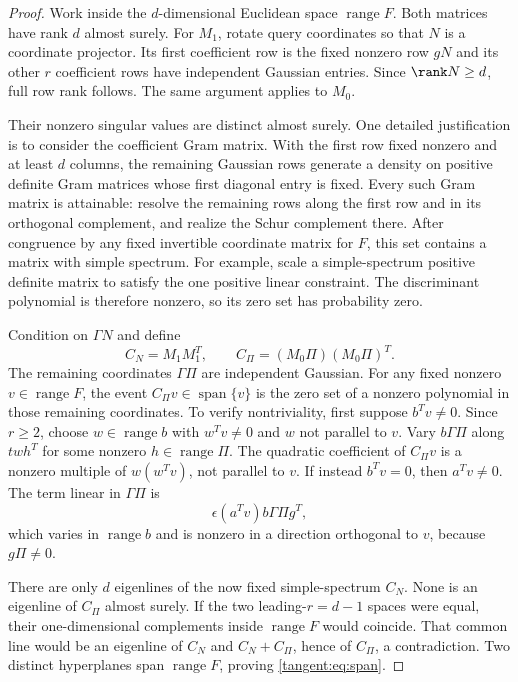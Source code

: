 \documentclass[11pt,oneside,openany,a4paper]{book}
\numberwithin{equation}{chapter}
\theoremstyle{definition}
\theoremstyle{remark}
\DeclareMathOperator{\ran}{range}\DeclareMathOperator{\OPT}{OPT}
\begin{document}
\begin{proof}
Work inside the $d$-dimensional Euclidean space $\ran F$. Both matrices have rank $d$ almost surely. For $M_1$, rotate query coordinates so that $N$ is a coordinate projector. Its first coefficient row is the fixed nonzero row $gN$ and its other $r$ coefficient rows have independent Gaussian entries. Since $\rank N\ge d$, full row rank follows. The same argument applies to $M_0$.

Their nonzero singular values are distinct almost surely. One detailed justification is to consider the coefficient Gram matrix. With the first row fixed nonzero and at least $d$ columns, the remaining Gaussian rows generate a density on positive definite Gram matrices whose first diagonal entry is fixed. Every such Gram matrix is attainable: resolve the remaining rows along the first row and in its orthogonal complement, and realize the Schur complement there. After congruence by any fixed invertible coordinate matrix for $F$, this set contains a matrix with simple spectrum. For example, scale a simple-spectrum positive definite matrix to satisfy the one positive linear constraint. The discriminant polynomial is therefore nonzero, so its zero set has probability zero.

Condition on $\Gamma N$ and define
\[
 C_N=M_1M_1^T,\qquad C_\Pi=(M_0\Pi)(M_0\Pi)^T.
\]
The remaining coordinates $\Gamma\Pi$ are independent Gaussian. For any fixed nonzero $v\in\ran F$, the event $C_\Pi v\in\operatorname{span}\{v\}$ is the zero set of a nonzero polynomial in those remaining coordinates. To verify nontriviality, first suppose $b^Tv\ne0$. Since $r\ge2$, choose $w\in\ran b$ with $w^Tv\ne0$ and $w$ not parallel to $v$. Vary $b\Gamma\Pi$ along $twh^T$ for some nonzero $h\in\ran\Pi$. The quadratic coefficient of $C_\Pi v$ is a nonzero multiple of $w(w^Tv)$, not parallel to $v$. If instead $b^Tv=0$, then $a^Tv\ne0$. The term linear in $\Gamma\Pi$ is
\[
 \epsilon(a^Tv)b\Gamma\Pi g^T,
\]
which varies in $\ran b$ and is nonzero in a direction orthogonal to $v$, because $g\Pi\ne0$.

There are only $d$ eigenlines of the now fixed simple-spectrum $C_N$. None is an eigenline of $C_\Pi$ almost surely. If the two leading-$r=d-1$ spaces were equal, their one-dimensional complements inside $\ran F$ would coincide. That common line would be an eigenline of $C_N$ and $C_N+C_\Pi$, hence of $C_\Pi$, a contradiction. Two distinct hyperplanes span $\ran F$, proving \eqref{tangent:eq:span}.
\end{proof}
\end{document}
